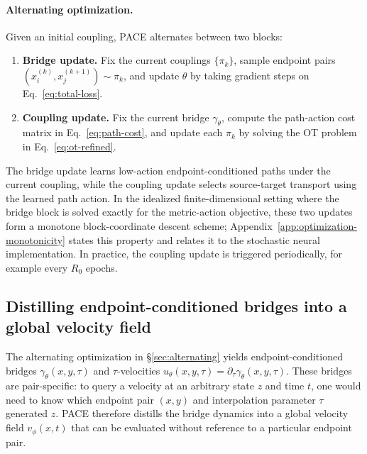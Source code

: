 \paragraph{Alternating optimization.}
Given an initial coupling, PACE alternates between two blocks:
\begin{enumerate}
    \item \textbf{Bridge update.} Fix the current couplings \(\{\pi_k\}\), sample endpoint pairs \((x_i^{(k)},x_j^{(k+1)})\sim\pi_k\), and update \(\theta\) by taking gradient steps on Eq.~\eqref{eq:total-loss}.

    \item \textbf{Coupling update.} Fix the current bridge \(\gamma_\theta\), compute the path-action cost matrix in Eq.~\eqref{eq:path-cost}, and update each \(\pi_k\) by solving the OT problem in Eq.~\eqref{eq:ot-refined}.
\end{enumerate}
The bridge update learns low-action endpoint-conditioned paths under the current coupling, while the coupling update selects source-target transport using the learned path action.
In the idealized finite-dimensional setting where the bridge block is solved exactly for the metric-action objective, these two updates form a monotone block-coordinate descent scheme; Appendix~\ref{app:optimization-monotonicity} states this property and relates it to the stochastic neural implementation.
In practice, the coupling update is triggered periodically, for example every \(R_0\) epochs.
    
\subsection{Distilling endpoint-conditioned bridges into a global velocity field}
\label{sec:distillation}

The alternating optimization in \S\ref{sec:alternating} yields endpoint-conditioned bridges \(\gamma_\theta(x,y,\tau)\) and \(\tau\)-velocities \(u_\theta(x,y,\tau)=\partial_\tau\gamma_\theta(x,y,\tau)\). These bridges are pair-specific: to query a velocity at an arbitrary state \(z\) and time \(t\), one would need to know which endpoint pair \((x,y)\) and interpolation parameter \(\tau\) generated \(z\). PACE therefore distills the bridge dynamics into a global velocity field \(v_\phi(x,t)\) that can be evaluated without reference to a particular endpoint pair.

